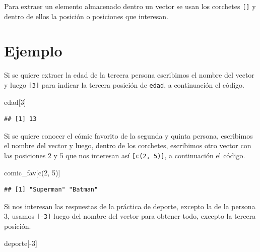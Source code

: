 \documentclass[
]{book}
\newenvironment{Shaded}{\begin{snugshade}}{\end{snugshade}}
\newcommand{\DecValTok}[1]{\textcolor[rgb]{0.00,0.00,0.81}{#1}}
\newcommand{\FunctionTok}[1]{\textcolor[rgb]{0.00,0.00,0.00}{#1}}
\newcommand{\NormalTok}[1]{#1}
\newcommand{\SpecialCharTok}[1]{\textcolor[rgb]{0.00,0.00,0.00}{#1}}
\begin{document}
Para extraer un elemento almacenado dentro un vector se usan los corchetes \texttt{{[}{]}} y dentro de ellos la posición o posiciones que interesan.

\hypertarget{ejemplo}{%
\section*{Ejemplo}\label{ejemplo}}

Si se quiere extraer la edad de la tercera persona escribimos el nombre del vector y luego \texttt{{[}3{]}} para indicar la tercera posición de \texttt{edad}, a continuación el código.

\begin{Shaded}
\begin{Highlighting}[]
\NormalTok{edad[}\DecValTok{3}\NormalTok{]}
\end{Highlighting}
\end{Shaded}

\begin{verbatim}
## [1] 13
\end{verbatim}

Si se quiere conocer el cómic favorito de la segunda y quinta persona, escribimos el nombre del vector y luego, dentro de los corchetes, escribimos otro vector con las posiciones 2 y 5 que nos interesan así \texttt{{[}c(2,\ 5){]}}, a continuación el código.

\begin{Shaded}
\begin{Highlighting}[]
\NormalTok{comic\_fav[}\FunctionTok{c}\NormalTok{(}\DecValTok{2}\NormalTok{, }\DecValTok{5}\NormalTok{)]}
\end{Highlighting}
\end{Shaded}

\begin{verbatim}
## [1] "Superman" "Batman"
\end{verbatim}

Si nos interesan las respuestas de la práctica de deporte, excepto la de la persona 3, usamos \texttt{{[}-3{]}} luego del nombre del vector para obtener todo, excepto la tercera posición.

\begin{Shaded}
\begin{Highlighting}[]
\NormalTok{deporte[}\SpecialCharTok{{-}}\DecValTok{3}\NormalTok{]}
\end{Highlighting}
\end{Shaded}
\end{document}
